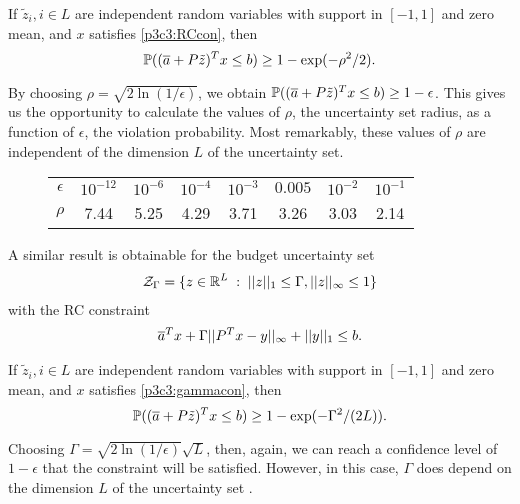 \begin{theorem}
If $\tilde{z}_i, i\in L$ are independent random variables with support in $[-1,1]$ and zero mean, and $x$ satisfies \eqref{p3c3:RCcon}, then
\[\mathbb{P} ( (\overline{ a }+P\tilde{z})^Tx\leq b)\geq 1-\exp (-\rho^2/2).\]
\end{theorem}

By choosing $\rho = \sqrt{2\ln(1/\epsilon)}$, we obtain $\mathbb{P} ( (\overline{ a }+P\tilde{z})^Tx\leq b)\geq 1-\epsilon$. This gives us the opportunity to calculate the values of $\rho$, the uncertainty set radius, as a function of $\epsilon$, the violation probability. Most remarkably, these values of $\rho$ are independent of the dimension $L$ of the uncertainty set.

\begin{figure}
\begin{tabular}{c|c|c|c|c|c|c|c}
 $\epsilon$	& $10^{-12}$	& $10^{-6}$	& $10^{-4}$ & $10^{-3}$	& $0.005$	& $10^{-2}$	& $10^{-1}$ \\
 $\rho$ 			&7.44					& 5.25			& 4.29		   & 3.71				& 3.26		& 3.03			& 2.14 \\
\end{tabular}
\end{figure}

A similar result is obtainable for the budget uncertainty set
\begin{align*}
\mathcal{Z}_\Gamma = \{z\in \mathbb{R}^L\; : \; \vert\vert z \vert\vert_1\leq \Gamma, \vert\vert z \vert\vert_\infty \leq 1\}
\end{align*}
with the RC constraint
\begin{align}\label{p3c3:gammacon}
\overline{ a }^Tx + \Gamma\vert\vert P^Tx-y \vert\vert_\infty + \vert\vert y \vert\vert_1 \leq b.
\end{align}
\begin{theorem}
If $\tilde{z}_i, i\in L$ are independent random variables with support in $[-1,1]$ and zero mean, and $x$ satisfies \eqref{p3c3:gammacon}, then
\[\mathbb{P} ( (\overline{ a }+P\tilde{z})^Tx\leq b)\geq 1-\exp (-\Gamma^2/(2L)). \]
\end{theorem}
Choosing $\Gamma = \sqrt{2\ln (1/\epsilon)}\sqrt{L}$, then, again, we can reach a confidence level of $1-\epsilon$ that the constraint will be satisfied. However, in this case, $\Gamma$ does depend on the dimension $L$ of the uncertainty set .
